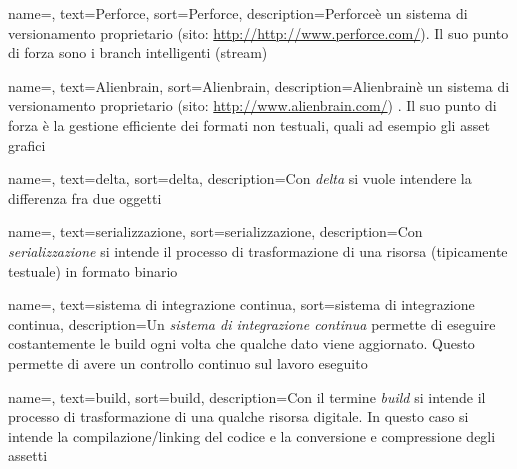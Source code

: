 {
	name=,
	text=Perforce\textregistered,
	sort=Perforce,
	description={Perforce\textregistered è un sistema di versionamento proprietario (sito: \url{http://http://www.perforce.com/}). Il suo punto di forza sono i branch intelligenti (stream)}
}

{
	name=,
	text=Alienbrain,
	sort=Alienbrain,
	description={Alienbrain\textregistered è un sistema di versionamento proprietario (sito: \url{http://www.alienbrain.com/}) . Il suo punto di forza è la gestione efficiente dei formati non testuali, quali ad esempio gli asset grafici}
}

{
	name=,
	text=delta,
	sort=delta,
	description={Con \emph{delta} si vuole intendere la differenza fra due oggetti}
}

{
	name=,
	text=serializzazione,
	sort=serializzazione,
	description={Con \emph{serializzazione} si intende il processo di trasformazione di una risorsa (tipicamente testuale) in formato binario}
}

{
	name=,
	text=sistema di integrazione continua,
	sort=sistema di integrazione continua,
	description={Un \emph{sistema di integrazione continua} permette di eseguire costantemente le build ogni volta che qualche dato viene aggiornato. Questo permette di avere un controllo continuo sul lavoro eseguito}
}

{
	name=,
	text=build,
	sort=build,
	description={Con il termine \emph{build} si intende il processo di trasformazione di una qualche risorsa digitale. In questo caso si intende la compilazione/linking del codice e la conversione e compressione degli assetti}
}